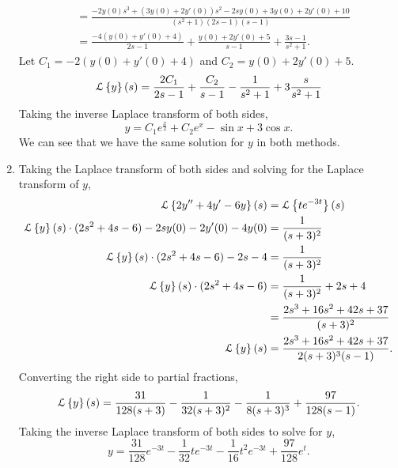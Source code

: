 \begin{enumerate}[label=\arabic*.]
\begin{align*}
			&= \frac{-2y(0)s^3 + (3y(0)+2y'(0))s^2 -2sy(0) + 3y(0) + 2y'(0) + 10}{\left(s^2+1\right)\left(2s-1\right)\left(s-1\right)} \\
			&= \frac{-4(y(0)+y'(0)+4)}{2s-1} + \frac{y(0)+2y'(0)+5}{s-1} + \frac{3s-1}{s^2+1}.
		\end{align*}
		Let $C_1 = -2(y(0)+y'(0)+4)$ and $C_2 = y(0) + 2y'(0) + 5$.
		\begin{equation*}
			\mathcal{L}\left\{ y \right\}\left(s\right) = \frac{2C_1}{2s-1} + \frac{C_2}{s-1} - \frac{1}{s^2+1} + 3\frac{s}{s^2+1}
		\end{equation*}
		Taking the inverse Laplace transform of both sides,
		\begin{equation*}
			y = C_1e^{\frac{x}{2}} + C_2e^x -\sin{x} + 3\cos{x}.
		\end{equation*}
		We can see that we have the same solution for $y$ in both methods.
	\item
		Taking the Laplace transform of both sides and solving for the Laplace transform of $y$,
		\begin{align*}
			\mathcal{L}\left\{ 2y'' + 4y' - 6y \right\}\left(s\right) &= \mathcal{L}\left\{ te^{-3t} \right\}\left(s\right) \\
			\mathcal{L}\left\{ y \right\}\left(s\right) \cdot (2s^2 + 4s - 6) - 2sy(0) - 2y'(0) - 4y(0) &= \frac{1}{(s+3)^2} \\
			\mathcal{L}\left\{ y \right\}\left(s\right) \cdot (2s^2 + 4s - 6) - 2s - 4 &= \frac{1}{(s+3)^2} \\
			\mathcal{L}\left\{ y \right\}\left(s\right) \cdot (2s^2 + 4s - 6) &= \frac{1}{(s+3)^2} + 2s + 4 \\
			&= \frac{2s^3 + 16s^2 + 42s + 37}{(s+3)^2} \\
			\mathcal{L}\left\{ y \right\}\left(s\right) &= \frac{2s^3 + 16s^2 + 42s + 37}{2(s+3)^3(s-1)}.
		\end{align*}
		Converting the right side to partial fractions,
		\begin{equation*}
			\mathcal{L}\left\{ y \right\}\left(s\right) = \frac{31}{128(s+3)} - \frac{1}{32(s+3)^2} - \frac{1}{8(s+3)^3} + \frac{97}{128(s-1)}.
		\end{equation*}
		Taking the inverse Laplace transform of both sides to solve for $y$,
		\begin{equation*}
			y = \frac{31}{128}e^{-3t} - \frac{1}{32}te^{-3t} - \frac{1}{16}t^2e^{-3t} + \frac{97}{128}e^{t}.
		\end{equation*}
\end{enumerate}